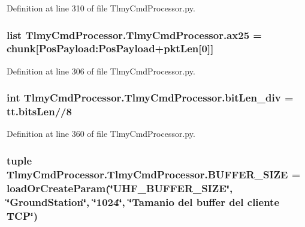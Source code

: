 Definition at line 310 of file Tlmy\+Cmd\+Processor.\+py.

\hypertarget{namespace_tlmy_cmd_processor_1_1_tlmy_cmd_processor_aa53bb04cb809e8c4f3d8c7e289a0dda9}{}
\subsubsection[{ax25}]{\setlength{\rightskip}{0pt plus 5cm}list Tlmy\+Cmd\+Processor.\+Tlmy\+Cmd\+Processor.\+ax25 = {\bf chunk}\mbox{[}Pos\+Payload\+:\+Pos\+Payload+{\bf pkt\+Len}\mbox{[}0\mbox{]}\mbox{]}}\label{namespace_tlmy_cmd_processor_1_1_tlmy_cmd_processor_aa53bb04cb809e8c4f3d8c7e289a0dda9}


Definition at line 306 of file Tlmy\+Cmd\+Processor.\+py.

\hypertarget{namespace_tlmy_cmd_processor_1_1_tlmy_cmd_processor_a0edb15456685b1cc3f3d2820c0c48f70}{}
\subsubsection[{bit\+Len\+\_\+div}]{\setlength{\rightskip}{0pt plus 5cm}int Tlmy\+Cmd\+Processor.\+Tlmy\+Cmd\+Processor.\+bit\+Len\+\_\+div = tt.\+bits\+Len//8}\label{namespace_tlmy_cmd_processor_1_1_tlmy_cmd_processor_a0edb15456685b1cc3f3d2820c0c48f70}


Definition at line 360 of file Tlmy\+Cmd\+Processor.\+py.

\hypertarget{namespace_tlmy_cmd_processor_1_1_tlmy_cmd_processor_ad6b870e079ada467cc4ac0b8f1f73039}{}
\subsubsection[{B\+U\+F\+F\+E\+R\+\_\+\+S\+I\+Z\+E}]{\setlength{\rightskip}{0pt plus 5cm}tuple Tlmy\+Cmd\+Processor.\+Tlmy\+Cmd\+Processor.\+B\+U\+F\+F\+E\+R\+\_\+\+S\+I\+Z\+E = load\+Or\+Create\+Param(\char`\"{}U\+H\+F\+\_\+\+B\+U\+F\+F\+E\+R\+\_\+\+S\+I\+Z\+E\char`\"{}, \char`\"{}Ground\+Station\char`\"{}, \char`\"{}1024\char`\"{}, \char`\"{}Tamanio del buffer del cliente T\+C\+P\char`\"{})}\label{namespace_tlmy_cmd_processor_1_1_tlmy_cmd_processor_ad6b870e079ada467cc4ac0b8f1f73039}


